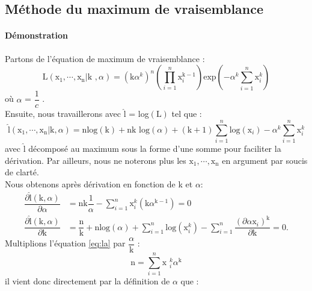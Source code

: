 \subsection{Méthode du maximum de vraisemblance}
\paragraph{Démonstration}
\noindent Partons de l'équation de maximum de vraisemblance : \\
\begin{equation}
\mbox{L}\left(\mbox{x}_{1},\cdots,\mbox{x}_{\mbox{n}}|\mbox{k },\alpha \right) = \left( \mbox{k} \alpha^{k} \right)^{n} \left( \prod\limits_{i=1}^{n} \mbox{x}^{\mbox{k}-1}_{i} \right) \mbox{exp}\left( -\alpha^{k} \sum\limits_{i=1}^n \mbox{x}^{k}_{i}\right)
\end{equation}
où $\alpha$ = $\dfrac{1}{c}$ . \\
Ensuite, nous travaillerons avec $\hat{\mbox{l}}$ = log$\left( \mbox{L} \right)$ tel que : 
\begin{equation}
\hat{\mbox{l}}(\mbox{x}_{1},\cdots,\mbox{x}_{\mbox{n}}|\mbox{k},\alpha) = \mbox{nlog}(\mbox{k}) + \mbox{nk log}(\alpha) + (\mbox{k}+1) \sum\limits_{i=1}^{n}\mbox{log}(\mbox{x}_{i}) - \alpha^{k} \sum\limits_{i=1}^{n} \mbox{x}^{k}_{i}
\end{equation}
avec $\hat{\mbox{l}}$ décomposé au maximum sous la forme d'une somme pour faciliter la dérivation. Par ailleurs, nous ne noterons plus les $\mbox{x}_{1},\cdots,\mbox{x}_{\mbox{n}}$ en argument par soucis de clarté. \\
Nous obtenons après dérivation en fonction de k et $\alpha$:
\begin{align}
\dfrac{\partial\hat{\mbox{l}}(\mbox{k},\alpha)}{\partial \alpha} &= \mbox{nk} \dfrac{1}{\alpha} - \sum\limits_{i=1}^{n} \mbox{x}^{k}_{i} \left( \mbox{k} \alpha^{\mbox{k}-1} \right) = 0 \label{eq:la} \\ \label{eq:lk}
\dfrac{\partial\hat{\mbox{l}}(\mbox{k},\alpha)}{\partial \mbox{k}} &= \dfrac{\mbox{n}}{\mbox{k}} + \mbox{n}\mbox{log}(\alpha) + \sum\limits_{i=1}^{n} \mbox{log}(\mbox{x}^{k}_{i}) - \sum\limits_{i=1}^{n} \dfrac{(\partial \alpha \mbox{x}_{i})^{\mbox{k}}}{\partial \mbox{k}} = 0.
\end{align}
Multiplions l'équation \ref{eq:la} par $\dfrac{\alpha}{\mbox{k}}$ :
\begin{equation}
\mbox{n} = \sum\limits_{i=1}^{n} \mbox{x }^{k}_{i} \alpha^{\mbox{k}} 
\end{equation}
il vient donc directement par la définition de $\alpha$ que :
